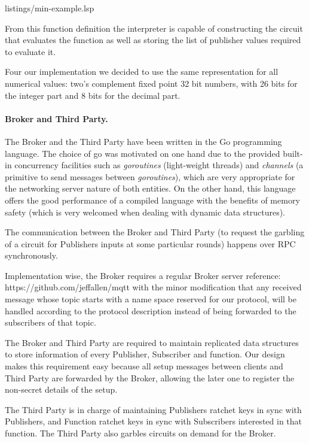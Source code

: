 
{listings/min-example.lsp}

From this function definition the interpreter is capable of constructing the
circuit that evaluates the function as well as storing the list of publisher
values required to evaluate it.

Four our implementation we decided to use the same representation for all
numerical values: two's complement fixed point 32 bit numbers, with 26 bits for
the integer part and 8 bits for the decimal part.

\paragraph{Broker and Third Party.}

The Broker and the Third Party have been written in the Go programming
language.  The choice of go was motivated on one hand due to the provided
built-in concurrency facilities such as \emph{goroutines} (light-weight
threads) and \emph{channels} (a primitive to send messages between
\emph{goroutines}), which are very appropriate for the networking server nature
of both entities.  On the other hand, this language offers the good performance
of a compiled language with the benefits of memory safety (which is very
welcomed when dealing with dynamic data structures).


The communication between the Broker and Third Party (to request the garbling
of a circuit for Publishers inputs at some particular rounds) happens over RPC
synchronously.

Implementation wise, the Broker requires a regular \MQTT{} Broker server
{reference: https://github.com/jeffallen/mqtt} with the minor modification that
any received message whose topic starts with a name space reserved for our
protocol, will be handled according to the protocol description instead of being forwarded to the subscribers of that topic.

The Broker and Third Party are required to maintain replicated data structures
to store information of every Publisher, Subscriber and function.  Our design
makes this requirement easy because all setup messages between clients and
Third Party are forwarded by the Broker, allowing the later one to register the
non-secret details of the setup.

The Third Party is in charge of maintaining Publishers ratchet keys in sync
with Publishers, and Function ratchet keys in sync with Subscribers interested
in that function.  The Third Party also garbles circuits on demand for the
Broker.

